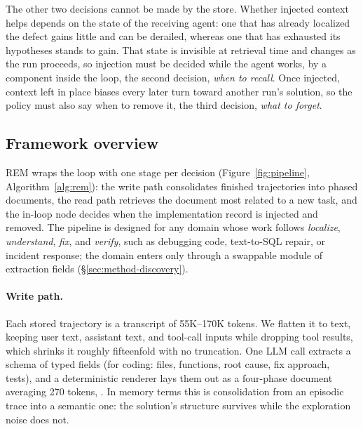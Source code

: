 \documentclass{article}
\newcommand{\sysname}{REM}
\begin{document}
The other two decisions cannot be made by the store. Whether injected context helps depends on the state of the receiving agent: one that has already localized the defect gains little and can be derailed, whereas one that has exhausted its hypotheses stands to gain. That state is invisible at retrieval time and changes as the run proceeds, so injection must be decided while the agent works, by a component inside the loop, the second decision, \textit{when to recall}. Once injected, context left in place biases every later turn toward another run's solution, so the policy must also say when to remove it, the third decision, \textit{what to forget}.

\subsection{Framework overview}
\label{sec:method-overview}

\sysname{} wraps the loop with one stage per decision (Figure~\ref{fig:pipeline}, Algorithm~\ref{alg:rem}): the write path consolidates finished trajectories into phased documents, the read path retrieves the document most related to a new task, and the in-loop node decides when the implementation record is injected and removed. The pipeline is designed for any domain whose work follows \emph{localize}, \emph{understand}, \emph{fix}, and \emph{verify}, such as debugging code, text-to-SQL repair, or incident response; the domain enters only through a swappable module of extraction fields (\S\ref{sec:method-discovery}).

\paragraph{Write path.} Each stored trajectory is a transcript of 55K--170K tokens. We flatten it to text, keeping user text, assistant text, and tool-call inputs while dropping tool results, which shrinks it roughly fifteenfold with no truncation. One LLM call extracts a schema of typed fields (for coding: files, functions, root cause, fix approach, tests), and a deterministic renderer lays them out as a four-phase document averaging 270 tokens, . In memory terms this is consolidation from an episodic trace into a semantic one: the solution's structure survives while the exploration noise does not.
\label{sec:method-write}
\end{document}
